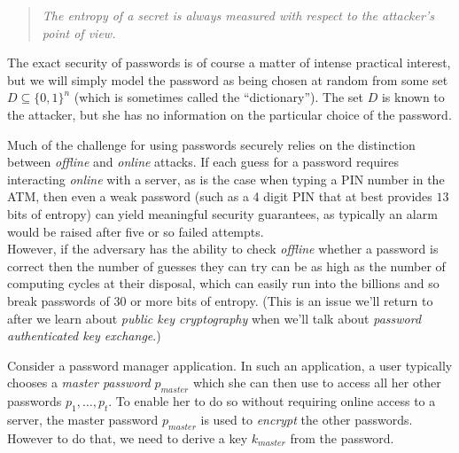 \begin{quote}
\emph{The entropy of a secret is always measured with respect to the
attacker's point of view.}
\end{quote}

The exact security of passwords is of course a matter of intense
practical interest, but we will simply model the password as being
chosen at random from some set \(D\subseteq\{0,1\}^n\) (which is
sometimes called the ``dictionary''). The set \(D\) is known to the
attacker, but she has no information on the particular choice of the
password.

Much of the challenge for using passwords securely relies on the
distinction between \emph{offline} and \emph{online} attacks. If each
guess for a password requires interacting \emph{online} with a server,
as is the case when typing a PIN number in the ATM, then even a weak
password (such as a 4 digit PIN that at best provides \(13\) bits of
entropy) can yield meaningful security guarantees, as typically an alarm
would be raised after five or so failed attempts.\\
However, if the adversary has the ability to check \emph{offline}
whether a password is correct then the number of guesses they can try
can be as high as the number of computing cycles at their disposal,
which can easily run into the billions and so break passwords of \(30\)
or more bits of entropy. (This is an issue we'll return to after we
learn about \emph{public key cryptography} when we'll talk about
\emph{password authenticated key exchange}.)

Consider a password manager application. In such an application, a user
typically chooses a \emph{master password} \(p_{master}\) which she can
then use to access all her other passwords \(p_1,\ldots,p_t\). To enable
her to do so without requiring online access to a server, the master
password \(p_{master}\) is used to \emph{encrypt} the other passwords.
However to do that, we need to derive a key \(k_{master}\) from the
password.



